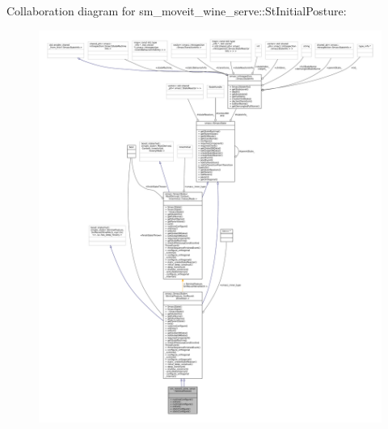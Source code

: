 Collaboration diagram for sm\+\_\+moveit\+\_\+wine\+\_\+serve\+:\+:St\+Initial\+Posture\+:
\nopagebreak
\begin{figure}[H]
\begin{center}
\leavevmode
\includegraphics[width=350pt]{structsm__moveit__wine__serve_1_1StInitialPosture__coll__graph}
\end{center}
\end{figure}
